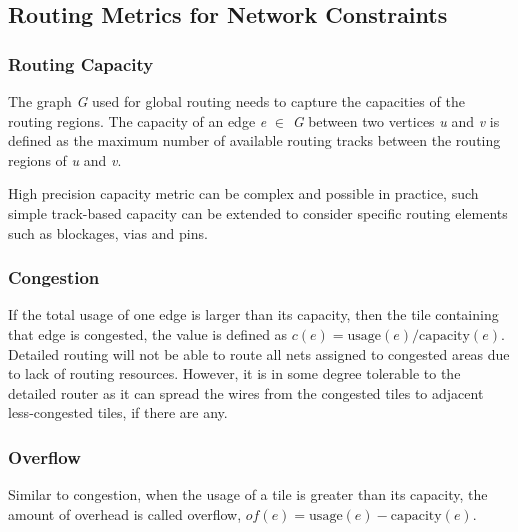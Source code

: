 \subsection{Routing Metrics for Network Constraints}
\subsubsection{Routing Capacity}
The graph \emph{G} used for global routing needs to capture the capacities of the routing regions. The capacity of an edge \emph{e} $\in$ \emph{G} between two vertices \emph{u} and \emph{v} is defined as the maximum number of available routing tracks between the routing regions of \emph{u} and \emph{v}. 

High precision capacity metric can be complex and possible in practice, such simple track-based capacity can be extended  to consider specific routing elements such as blockages, vias and pins.
\subsubsection{Congestion}
If the total usage of one edge is larger than its capacity, then the tile containing that edge is congested, the value is defined as $c(e)=\text{usage}(e)/\text{capacity}(e)$. Detailed routing will not be able to route all nets assigned to congested areas due to lack of routing resources. However, it is in some degree tolerable to the detailed router as it can spread the wires from the congested tiles to adjacent less-congested tiles, if there are any.
\subsubsection{Overflow}
Similar to congestion, when the usage of a tile is greater than its capacity, the amount of overhead is called overflow, $of(e)=\text{usage}(e)-\text{capacity}(e)$.


